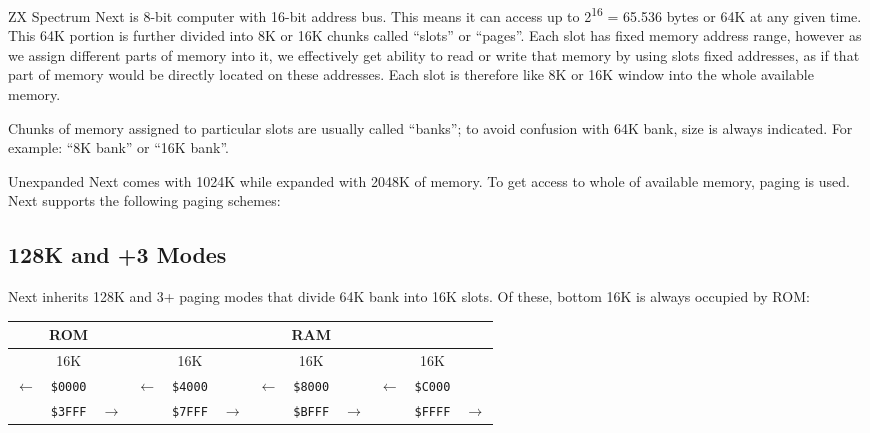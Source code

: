 \documentclass[12pt,twoside,openright,a4paper]{book}
\newcommand{\notet}{\rule{0pt}{2.4ex}}
\newcommand{\noteb}{\rule[-1.3ex]{0pt}{0pt}}
\begin{document}
\newcommand{\colnoline}[1]{\multicolumn{1}{c}{#1}}

ZX Spectrum Next is 8-bit computer with 16-bit address bus. This means it can access up to 2\textsuperscript{16} = 65.536 bytes or 64K at any given time. This 64K portion is further divided into 8K or 16K chunks called ``slots'' or ``pages''. Each slot has fixed memory address range, however as we assign different parts of memory into it, we effectively get ability to read or write that memory by using slots fixed addresses, as if that part of memory would be directly located on these addresses. Each slot is therefore like 8K or 16K window into the whole available memory.

Chunks of memory assigned to particular slots are usually called ``banks''; to avoid confusion with 64K bank, size is always indicated. For example: ``8K bank'' or ``16K bank''.

Unexpanded Next comes with 1024K while expanded with 2048K of memory. To get access to whole of available memory, paging is used. Next supports the following paging schemes:

\subsection{128K and +3 Modes}

Next inherits 128K and 3+ paging modes that divide 64K bank into 16K slots. Of these, bottom 16K is always occupied by ROM:

\begingroup
	\setlength{\tabcolsep}{1pt}
	\begin{tabular}{|ccc|ccc|ccc|ccc|}
		\hline
		\multicolumn{3}{|c}{ROM}\notet\noteb &
			\multicolumn{9}{|c|}{RAM} \\
		\hline
		\multicolumn{3}{|c}{16K}\notet\noteb &
			\multicolumn{3}{|c}{16K} &
			\multicolumn{3}{|c}{16K} &
			\multicolumn{3}{|c|}{16K} \\
		\hline
		\colnoline{$\leftarrow$}\notet & \colnoline{\tt \$0000} & \colnoline{} &
			\colnoline{$\leftarrow$} & \colnoline{\tt \$4000} & \colnoline{} &
			\colnoline{$\leftarrow$} & \colnoline{\tt \$8000} & \colnoline{} &
			\colnoline{$\leftarrow$} & \colnoline{\tt \$C000} & \colnoline{} \\
		\colnoline{} & \colnoline{\tt \$3FFF} & \colnoline{$\rightarrow$} &
			\colnoline{} & \colnoline{\tt \$7FFF} & \colnoline{$\rightarrow$} &
			\colnoline{} & \colnoline{\tt \$BFFF} & \colnoline{$\rightarrow$} &
			\colnoline{} & \colnoline{\tt \$FFFF} & \colnoline{$\rightarrow$} \\
	\end{tabular}
\endgroup
\end{document}
